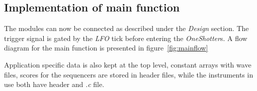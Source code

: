 \subsection{Implementation of main function}

The modules can now be connected as described under the \emph{Design} section.
The trigger signal is gated by the \emph{LFO} tick before entering the
\emph{OneShotter}s. A flow diagram for the main function is presented in
figure~\ref{fig:mainflow}


Application specific data is also kept at the top level, constant arrays with
wave files, scores for the sequencers are stored in header files, while the
instruments in use both have header and \emph{.c} file.
